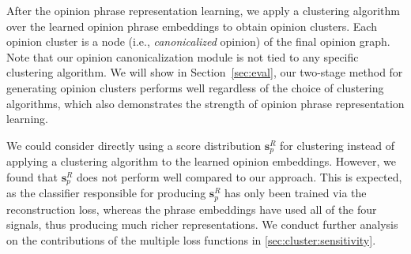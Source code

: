 After the opinion phrase representation learning, we apply a clustering algorithm over the learned opinion phrase embeddings to obtain opinion clusters. Each
opinion cluster is a node (i.e., {\it canonicalized} opinion) of the final opinion graph. 
Note that our opinion canonicalization
module is not tied to any specific
clustering algorithm. 
We will show in Section~\ref{sec:eval}, our two-stage method for generating opinion clusters performs well regardless of the choice of clustering algorithms, which also demonstrates the strength of 
opinion phrase representation learning.


We could consider directly using a score distribution $\mathbf{s}^R_p$ for clustering instead of applying a clustering algorithm to the learned opinion embeddings. However, we found that $\mathbf{s}^R_p$ does not perform well compared to our approach. This is expected, as the classifier responsible for producing $\mathbf{s}^R_p$ has only been trained via the reconstruction loss, whereas the phrase embeddings have used all of the four signals, thus producing much richer representations.
We conduct further analysis on the contributions of the multiple loss functions in \ref{sec:cluster:sensitivity}.
